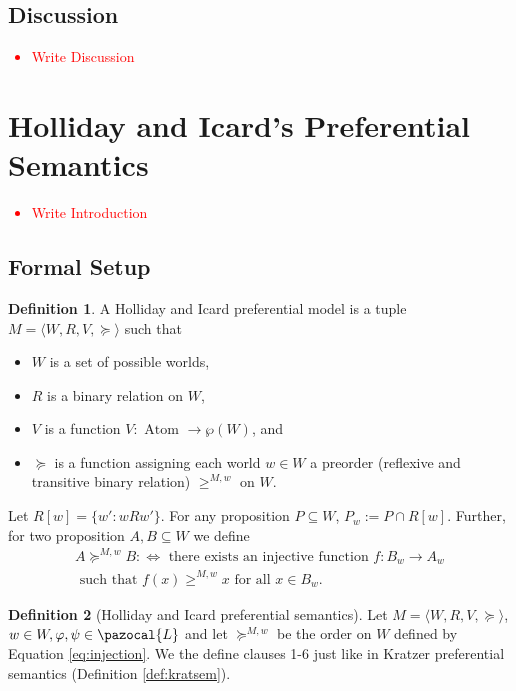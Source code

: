 \documentclass{article}
\theoremstyle{definition}
\newtheorem{definition}{Definition}
\newcommand\todo[1]{\textcolor{red}{#1}}
\renewcommand{\L}{\pazocal{L}}
\begin{document}
\subsection{Discussion}
\todo{
  \begin{itemize}
    \item Write Discussion
  \end{itemize}
}
\section{Holliday and Icard's Preferential Semantics}
\todo{
  \begin{itemize}
    \item Write Introduction
  \end{itemize}
}
\subsection{Formal Setup}
\begin{definition}
    A Holliday and Icard preferential model is a tuple $M = {\langle
      W,R,V,\succeq\rangle}$ such that
    \begin{itemize}[nosep]
        \renewcommand\labelitemi{--}
      \item $W$ is a set of possible worlds,
      \item $R$ is a binary relation on $W$,
      \item $V$ is a function $V: \text{ Atom } \rightarrow \wp(W)$, and
      \item $\succeq$ is a function assigning each world $w \in W$ a preorder
        (reflexive and transitive binary relation) $\geq^{M,w}$ on $W$. 
    \end{itemize}
\end{definition}
Let $R[w] = \{w':wRw'\}$. For any proposition $P \subseteq W$, $P_w := P \cap R[w]$. Further, for two proposition $A,B \subseteq W$ we define
\begin{multline}
    \label{eq:injection}A \succeq^{M,w} B :\iff \text{ there exists an injective function } f: B_w \rightarrow A_w \\ \text{ such that } f(x) \geq^{M,w} x \text{ for all } x \in B_w.
\end{multline}

\begin{definition}[Holliday and Icard preferential semantics] Let $M = {\langle
      W,R,V,\succeq \rangle}$, $w \in W, \varphi,\psi \in \L$ and let $\succeq^{M,w}$ be the order on $W$ defined by Equation \ref{eq:injection}. We the define clauses 1-6 just like in Kratzer preferential semantics (Definition \ref{def:kratsem}).
\end{definition}
\end{document}
